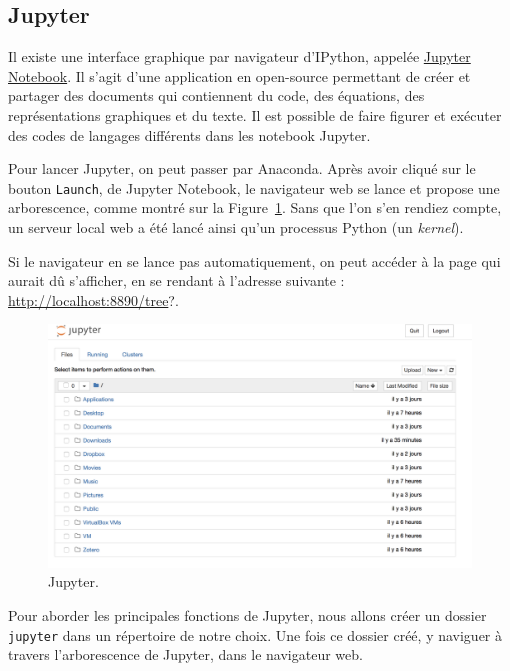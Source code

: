 \documentclass[
  12pt,
]{book}
\numberwithin{equation}{section}
\numberwithin{countremarque}{section}
\begin{document}
\subsection{Jupyter}\label{jupyter}

Il existe une interface graphique par navigateur d'IPython, appelée \href{http://jupyter.org/}{Jupyter Notebook}. Il s'agit d'une application en open-source permettant de créer et partager des documents qui contiennent du code, des équations, des représentations graphiques et du texte. Il est possible de faire figurer et exécuter des codes de langages différents dans les notebook Jupyter.

Pour lancer Jupyter, on peut passer par Anaconda. Après avoir cliqué sur le bouton \texttt{Launch}, de Jupyter Notebook, le navigateur web se lance et propose une arborescence, comme montré sur la Figure~\ref{fig:intro-jupyter}. Sans que l'on s'en rendiez compte, un serveur local web a été lancé ainsi qu'un processus Python (un \emph{kernel}).

Si le navigateur en se lance pas automatiquement, on peut accéder à la page qui aurait dû s'afficher, en se rendant à l'adresse suivante : \url{http://localhost:8890/tree}?.

\begin{figure}[H]

{\centering \includegraphics[width=1\linewidth]{figs/jupyter} 

}

\caption{Jupyter.}\label{fig:intro-jupyter}
\end{figure}

Pour aborder les principales fonctions de Jupyter, nous allons créer un dossier \texttt{jupyter} dans un répertoire de notre choix. Une fois ce dossier créé, y naviguer à travers l'arborescence de Jupyter, dans le navigateur web.
\end{document}
